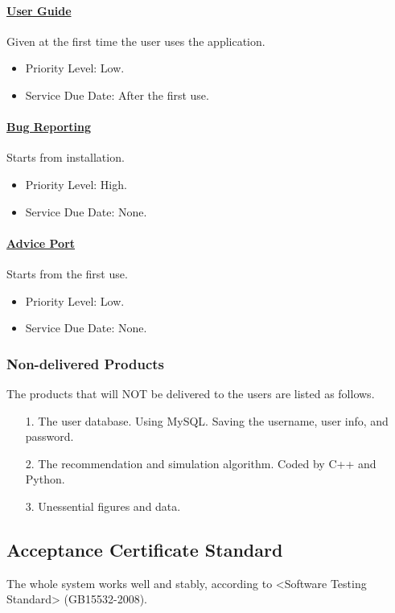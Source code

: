 \documentclass[10pt]{article}
\begin{document}
\paragraph{\underline{User Guide}} Given at the first time the user uses the application.

\begin{itemize}
	\item Priority Level: Low.
	\item Service Due Date: After the first use.
\end{itemize}

\paragraph{\underline{Bug Reporting}} Starts from installation.

\begin{itemize}
	\item Priority Level: High.
	\item Service Due Date: None.
\end{itemize}

\paragraph{\underline{Advice Port}} Starts from the first use.

\begin{itemize}
	\item Priority Level: Low.
	\item Service Due Date: None.
\end{itemize}

\subsubsection{Non-delivered Products}
The products that will NOT be delivered to the users are listed as follows.

\begin{itemize}
	\item[1.] The user database. Using MySQL. Saving the username, user info, and password.
	\item[2.] The recommendation and simulation algorithm. Coded by C++ and Python. 
	\item[3.] Unessential figures and data.
\end{itemize}

\subsection{Acceptance Certificate Standard}
The whole system works well and stably, according to <Software Testing Standard> (GB15532-2008).
\end{document}
